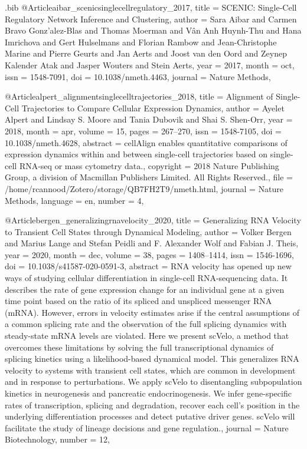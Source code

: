 \documentclass[
  table,
  10pt,
  a4paper]{article}
\begin{document}
\begin{filecontents}{\jobname.bib}
@Article{aibar_scenicsinglecellregulatory_2017,
	title = {{{SCENIC}}: Single-Cell Regulatory Network Inference and Clustering},
	author = {Sara Aibar and Carmen Bravo Gonz{\a'a}lez-Blas and Thomas Moerman and V{\^a}n Anh Huynh-Thu and Hana Imrichova and Gert Hulselmans and Florian Rambow and Jean-Christophe Marine and Pierre Geurts and Jan Aerts and Joost {van den Oord} and Zeynep Kalender Atak and Jasper Wouters and Stein Aerts},
	year = {2017},
	month = {oct},
	issn = {1548-7091},
	doi = {10.1038/nmeth.4463},
	journal = {Nature Methods},
}

@Article{alpert_alignmentsinglecelltrajectories_2018,
	title = {Alignment of Single-Cell Trajectories to Compare Cellular Expression Dynamics},
	author = {Ayelet Alpert and Lindsay S. Moore and Tania Dubovik and Shai S. Shen-Orr},
	year = {2018},
	month = {apr},
	volume = {15},
	pages = {267--270},
	issn = {1548-7105},
	doi = {10.1038/nmeth.4628},
	abstract = {cellAlign enables quantitative comparisons of expression dynamics within and between single-cell trajectories based on single-cell RNA-seq or mass cytometry data.},
	copyright = {2018 Nature Publishing Group, a division of Macmillan Publishers Limited. All Rights Reserved.},
	file = {/home/rcannood/Zotero/storage/QB7FH2T9/nmeth.html},
	journal = {Nature Methods},
	language = {en},
	number = {4},
}

@Article{bergen_generalizingrnavelocity_2020,
	title = {Generalizing {{RNA}} Velocity to Transient Cell States through Dynamical Modeling},
	author = {Volker Bergen and Marius Lange and Stefan Peidli and F. Alexander Wolf and Fabian J. Theis},
	year = {2020},
	month = {dec},
	volume = {38},
	pages = {1408--1414},
	issn = {1546-1696},
	doi = {10.1038/s41587-020-0591-3},
	abstract = {RNA velocity has opened up new ways of studying cellular differentiation in single-cell RNA-sequencing data. It describes the rate of gene expression change for an individual gene at a given time point based on the ratio of its spliced and unspliced messenger RNA (mRNA). However, errors in velocity estimates arise if the central assumptions of a common splicing rate and the observation of the full splicing dynamics with steady-state mRNA levels are violated. Here we present scVelo, a method that overcomes these limitations by solving the full transcriptional dynamics of splicing kinetics using a likelihood-based dynamical model. This generalizes RNA velocity to systems with transient cell states, which are common in development and in response to perturbations. We apply scVelo to disentangling subpopulation kinetics in neurogenesis and pancreatic endocrinogenesis. We infer gene-specific rates of transcription, splicing and degradation, recover each cell's position in the underlying differentiation processes and detect putative driver genes. scVelo will facilitate the study of lineage decisions and gene regulation.},
	journal = {Nature Biotechnology},
	number = {12},
}


\end{filecontents}
\end{document}
